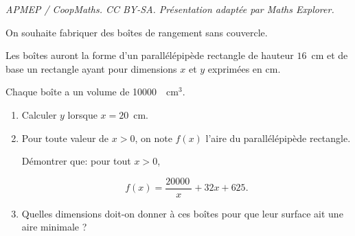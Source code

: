\documentclass[10pt]{article}
\providecommand{\np}[2][]{{#2~#1}}
\begin{document}
\noindent\textit{APMEP / CoopMaths. CC BY-SA. Présentation adaptée par Maths Explorer.}\par\medskip
\medskip

On souhaite fabriquer des boîtes de rangement sans couvercle.

Les boîtes auront la forme d'un parallélépipède rectangle de hauteur $16$~cm et de base un rectangle ayant pour dimensions $x$ et $y$ exprimées en cm. 

Chaque boîte a un volume de \np{10000}~cm$^3$.

\medskip

\begin{enumerate}
\item Calculer $y$ lorsque $x = 20$~cm.
\item  Pour toute valeur de $x > 0$, on note $f(x)$ l'aire du parallélépipède rectangle.

Démontrer que: pour tout $x > 0$,

\[f(x) = \dfrac{\np{20000}}{x} +32x +625.\]

\item  Quelles dimensions doit-on donner à ces boîtes pour que leur surface ait une aire minimale ?
\end{enumerate}
\end{document}

